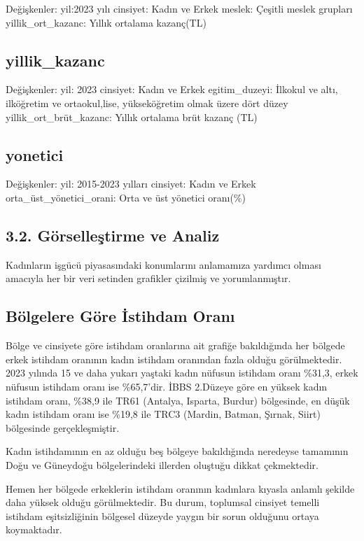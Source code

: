 \documentclass[
  11pt,
  a4paper,
  DIV=11,
  numbers=noendperiod]{scrartcl}
\begin{document}
Değişkenler: yil:2023 yılı cinsiyet: Kadın ve Erkek meslek: Çeşitli
meslek grupları yillik\_ort\_kazanc: Yıllık ortalama kazanç(TL)

\subsection{yillik\_kazanc}\label{yillik_kazanc}

Değişkenler: yil: 2023 cinsiyet: Kadın ve Erkek egitim\_duzeyi: İlkokul
ve altı, ilköğretim ve ortaokul,lise, yükseköğretim olmak üzere dört
düzey yillik\_ort\_brüt\_kazanc: Yıllık ortalama brüt kazanç (TL)

\subsection{yonetici}\label{yonetici}

Değişkenler: yil: 2015-2023 yılları cinsiyet: Kadın ve Erkek
orta\_üst\_yönetici\_orani: Orta ve üst yönetici oranı(\%)

\subsection{3.2. Görselleştirme ve
Analiz}\label{guxf6rselleux15ftirme-ve-analiz}

Kadınların işgücü piyasasındaki konumlarını anlamamıza yardımcı olması
amacıyla her bir veri setinden grafikler çizilmiş ve yorumlanmıştır.

\subsection{Bölgelere Göre İstihdam
Oranı}\label{buxf6lgelere-guxf6re-istihdam-oranux131}

Bölge ve cinsiyete göre istihdam oranlarına ait grafiğe bakıldığında her
bölgede erkek istihdam oranının kadın istihdam oranından fazla olduğu
görülmektedir. 2023 yılında 15 ve daha yukarı yaştaki kadın nüfusun
istihdam oranı \%31,3, erkek nüfusun istihdam oranı ise \%65,7'dir. İBBS
2.Düzeye göre en yüksek kadın istihdam oranı, \%38,9 ile TR61 (Antalya,
Isparta, Burdur) bölgesinde, en düşük kadın istihdam oranı ise \%19,8
ile TRC3 (Mardin, Batman, Şırnak, Siirt) bölgesinde gerçekleşmiştir.

Kadın istihdamının en az olduğu beş bölgeye bakıldığında neredeyse
tamamının Doğu ve Güneydoğu bölgelerindeki illerden oluştuğu dikkat
çekmektedir.

Hemen her bölgede erkeklerin istihdam oranının kadınlara kıyasla anlamlı
şekilde daha yüksek olduğu görülmektedir. Bu durum, toplumsal cinsiyet
temelli istihdam eşitsizliğinin bölgesel düzeyde yaygın bir sorun
olduğunu ortaya koymaktadır.
\end{document}
